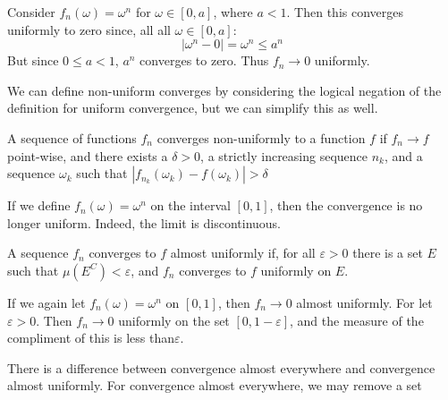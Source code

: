 \documentclass[crop=false,class=book,oneside]{standalone}
\begin{document}
        \begin{example}
            Consider $f_{n}(\omega)=\omega^{n}$ for
            $\omega\in[0,a]$, where $a<1$. Then this
            converges uniformly to zero since, all all
            $\omega\in[0,a]$:
            \begin{equation}
                |\omega^{n}-0|=\omega^{n}\leq{a}^{n}
            \end{equation}
            But since $0\leq{a}<1$, $a^{n}$ converges to
            zero. Thus $f_{n}\rightarrow{0}$ uniformly.
        \end{example}
        We can define non-uniform converges by considering
        the logical negation of the definition for
        uniform convergence, but we can simplify this as
        well.
        \begin{theorem}
            A sequence of functions $f_{n}$ converges
            non-uniformly to a function $f$ if
            $f_{n}\rightarrow{f}$ point-wise, and there
            exists a $\delta>0$, a strictly increasing
            sequence $n_{k}$, and a sequence $\omega_{k}$
            such that
            $|f_{n_{k}}(\omega_{k})-f(\omega_{k})|>\delta$
        \end{theorem}
        \begin{example}
            If we define $f_{n}(\omega)=\omega^{n}$ on the
            interval $[0,1]$, then the convergence is no
            longer uniform. Indeed, the limit is
            discontinuous.
        \end{example}
        \begin{definition}
            A sequence $f_{n}$ converges to $f$ almost
            uniformly if, for all $\varepsilon>0$ there is
            a set $E$ such that $\mu(E^{C})<\varepsilon$,
            and $f_{n}$ converges to $f$ uniformly on
            $E$.
        \end{definition}
        \begin{example}
            If we again let $f_{n}(\omega)=\omega^{n}$ on
            $[0,1]$, then $f_{n}\rightarrow{0}$
            almost uniformly. For let $\varepsilon>0$. Then
            $f_{n}\rightarrow{0}$ uniformly on the set
            $[0,1-\varepsilon]$, and the measure of the
            compliment of this is less than$ \varepsilon$.
        \end{example}
        There is a difference between convergence almost
        everywhere and convergence almost uniformly. For
        convergence almost everywhere, we may remove a set
\end{document}
